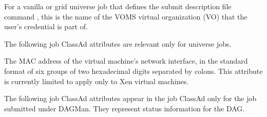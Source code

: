 \begin{description}
\item[\AdAttr{X509UserProxyVOName}:]   
For a vanilla or grid universe job that defines the submit description
file command , 
this is the name of the VOMS virtual organization (VO) that 
the user's credential is part of. 

\end{description}

The following job ClassAd attributes are relevant only for
 universe jobs.

\begin {description}

\item[\AdAttr{VM\_MACAddr}:] The MAC address of the virtual
machine's network interface,
in the standard format of six groups of
two hexadecimal digits separated by colons.
This attribute is currently limited to apply only to Xen virtual machines.






\end{description}

\label{Job-ClassAd-DAGManAttributes}
The following job ClassAd attributes appear in the job ClassAd
only for the 
job submitted under DAGMan.
They represent status information for the DAG.

